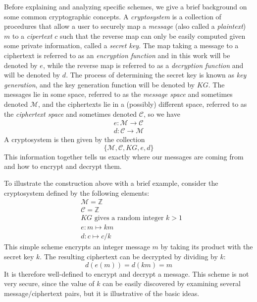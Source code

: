 \documentclass[11pt]{report}
\newcommand{\Z}{\mathbb{Z}}
\newcommand{\M}{\mathcal{M}}
\newcommand{\lra}{\longrightarrow}
\begin{document}
Before explaining and analyzing specific schemes, we give a brief background on some common cryptographic concepts. A \emph{cryptosystem} is a collection of procedures that allow a user to securely map a \emph{message} (also called a \emph{plaintext}) $m$ to a \emph{cipertext} $c$ such that the reverse map can only be easily computed given some private information, called a \emph{secret key}. The map taking a message to a ciphertext is referred to as an \emph{encryption function} and in this work will be denoted by $e$, while the reverse map is referred to as a \emph{decryption function} and will be denoted by $d$. The process of determining the secret key is known as \emph{key generation}, and the key generation function will be denoted by $KG$. The messages lie in some space, referred to as the \emph{message space} and sometimes denoted $\M$, and the ciphertexts lie in a (possibly) different space, referred to as the \emph{ciphertext space} and sometimes denoted $\mathcal{C}$, so we have
\begin{align*}
e: \M \lra \mathcal{C} \\
d: \mathcal{C} \lra \M
\end{align*}
A cryptosystem is then given by the collection \[\{\M, \mathcal{C},  KG, e, d\}\] This information together tells us exactly where our messages are coming from and how to encrypt and decrypt them.

\label{Example1}To illustrate the construction above with a brief example, consider the cryptosystem defined by the following elements:
\begin{align*}
&\M = \Z \\
&\mathcal{C} = \Z \\
&KG \text{ gives a random integer } k>1 \\
&e: m \mapsto km \\
&d: c \mapsto c/k
\end{align*}
\noindent This simple scheme encrypts an integer message $m$ by taking its product with the secret key $k$. The resulting ciphertext can be decrypted by dividing by $k$: \[d(e(m)) = d(km) = m\] It is therefore well-defined to encrypt and decrypt a message. This scheme is not very secure, since the value of $k$ can be easily discovered by examining several message/ciphertext pairs, but it is illustrative of the basic ideas.
\end{document}
